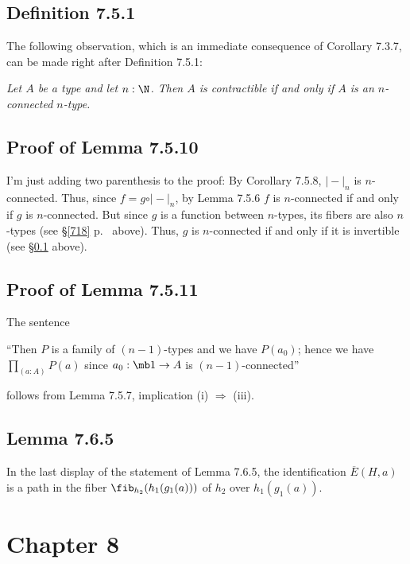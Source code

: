 \documentclass[12pt]{article}
\begin{document}

\subsection{Definition 7.5.1}\label{751}

The following observation, which is an immediate consequence of Corollary 7.3.7, can be made right after Definition 7.5.1:

\nn\emph{Let $A$ be a type and let $n:\N$. Then $A$ is contractible if and only if $A$ is an $n$-connected $n$-type.}


\subsection{Proof of Lemma 7.5.10}

I'm just adding two parenthesis to the proof: By Corollary 7.5.8, $\vert-\vert_n$ is $n$-connected. Thus, since $f=g\circ\vert-\vert_n$, by Lemma 7.5.6 $f$ is $n$-connected if and only if $g$ is $n$-connected. But since $g$ is a function between $n$-types, its fibers are also $n$-types (see \S\ref{718} p.~\pageref{718} above). Thus, $g$ is $n$-connected if and only if it is invertible (see \S\ref{751} above).


\subsection{Proof of Lemma 7.5.11}

The sentence 

\nn``Then $P$ is a family of $(n-1)$-types and we have $P(a_0)$; hence we have $\prod_{(a:A)}P(a)$ since $a_0:\mb1\to A$ is $(n-1)$-connected''

\nn follows from Lemma 7.5.7, implication (i) $\Rightarrow$ (iii).


\subsection{Lemma 7.6.5}

In the last display of the statement of Lemma 7.6.5, the identification $\overline{E}(H,a)$ is a path in the fiber $\fib_{h_2}(h_1(g_1(a)))$ of $h_2$ over $h_1(g_1(a))$.


\section{Chapter 8}
\end{document}
